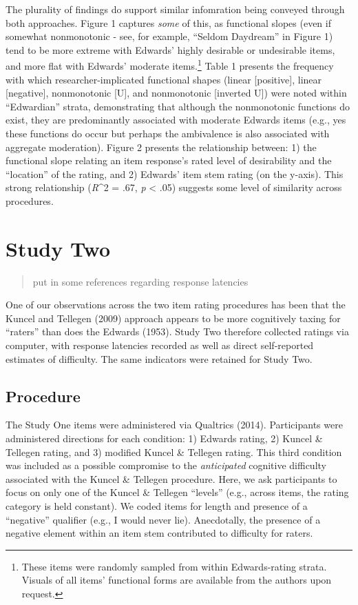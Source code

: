 \documentclass[
  english,
  ,jou]{apa6}
\begin{document}
The plurality of findings do support similar infomration being conveyed through both approaches. Figure 1 captures \emph{some} of this, as functional slopes (even if somewhat nonmonotonic - see, for example, ``Seldom Daydream'' in Figure 1) tend to be more extreme with Edwards' highly desirable or undesirable items, and more flat with Edwards' moderate items.\footnote{These items were randomly sampled from within Edwards-rating strata. Visuals of all items' functional forms are available from the authors upon request.} Table 1 presents the frequency with which researcher-implicated functional shapes (linear {[}positive{]}, linear {[}negative{]}, nonmonotonic {[}U{]}, and nonmonotonic {[}inverted U{]}) were noted within ``Edwardian'' strata, demonstrating that although the nonmonotonic functions do exist, they are predominantly associated with moderate Edwards items (e.g., yes these functions do occur but perhaps the ambivalence is also associated with aggregate moderation). Figure 2 presents the relationship between: 1) the functional slope relating an item response's rated level of desirability and the ``location'' of the rating, and 2) Edwards' item stem rating (on the y-axis). This strong relationship (\emph{R}\^{}2 = .67, \emph{p} \textless{} .05) suggests some level of similarity across procedures.

\hypertarget{study-two}{%
\section{Study Two}\label{study-two}}

\begin{quote}
put in some references regarding response latencies
\end{quote}

One of our observations across the two item rating procedures has been that the Kuncel and Tellegen (2009) approach appears to be more cognitively taxing for ``raters'' than does the Edwards (1953). Study Two therefore collected ratings via computer, with response latencies recorded as well as direct self-reported estimates of difficulty. The same indicators were retained for Study Two.

\hypertarget{procedure-1}{%
\subsection{Procedure}\label{procedure-1}}

The Study One items were administered via Qualtrics (2014). Participants were administered directions for each condition: 1) Edwards rating, 2) Kuncel \& Tellegen rating, and 3) modified Kuncel \& Tellegen rating. This third condition was included as a possible compromise to the \emph{anticipated} cognitive difficulty associated with the Kuncel \& Tellegen procedure. Here, we ask participants to focus on only one of the Kuncel \& Tellegen ``levels'' (e.g., across items, the rating category is held constant). We coded items for length and presence of a ``negative'' qualifier (e.g., I would never lie). Anecdotally, the presence of a negative element within an item stem contributed to difficulty for raters.
\end{document}
